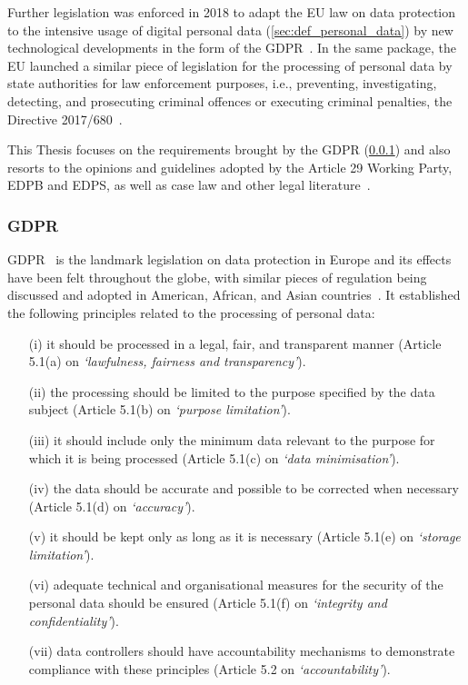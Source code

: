 Further legislation was enforced in 2018 to adapt the EU law on data protection to the intensive usage of digital personal data (\ref{sec:def_personal_data}) by new technological developments in the form of the GDPR~\citeyearpar{noauthor_regulation_2016}.
In the same package, the EU launched a similar piece of legislation for the processing of personal data by state authorities for law enforcement purposes, i.e., preventing, investigating, detecting, and prosecuting criminal offences or executing criminal penalties, the Directive 2017/680~\citeyearpar{noauthor_directive_2016}.

This Thesis focuses on the requirements brought by the GDPR (\ref{sec:def_gdpr}) and also resorts to the opinions and guidelines adopted by the Article 29 Working Party, EDPB and EDPS, as well as case law and other legal literature~\citep{european_union_agency_for_fundamental_rights_and_council_of_europe_handbook_2018}.

\subsubsection{GDPR}
\label{sec:def_gdpr}

GDPR~\citeyearpar{noauthor_regulation_2016} is the landmark legislation on data protection in Europe and its effects have been felt throughout the globe, with similar pieces of regulation being discussed and adopted in American, African, and Asian countries~\citep{bradford_brussels_2019}. It established the following principles related to the processing of personal data:
\begin{enumerate}
    \item [(i)] it should be processed in a legal, fair, and transparent manner (Article 5.1(a) on \textit{`lawfulness, fairness and transparency'}).
    \item [(ii)] the processing should be limited to the purpose specified by the data subject (Article 5.1(b) on \textit{`purpose limitation'}).
    \item [(iii)] it should include only the minimum data relevant to the purpose for which it is being processed (Article 5.1(c) on \textit{`data minimisation'}).
    \item [(iv)] the data should be accurate and possible to be corrected when necessary (Article 5.1(d) on \textit{`accuracy'}).
    \item [(v)] it should be kept only as long as it is necessary (Article 5.1(e) on \textit{`storage limitation'}).
    \item [(vi)] adequate technical and organisational measures for the security of the personal data should be ensured (Article 5.1(f) on \textit{`integrity and confidentiality'}).
    \item [(vii)] data controllers should have accountability mechanisms to demonstrate compliance with these principles (Article 5.2 on \textit{`accountability'}).
\end{enumerate}

